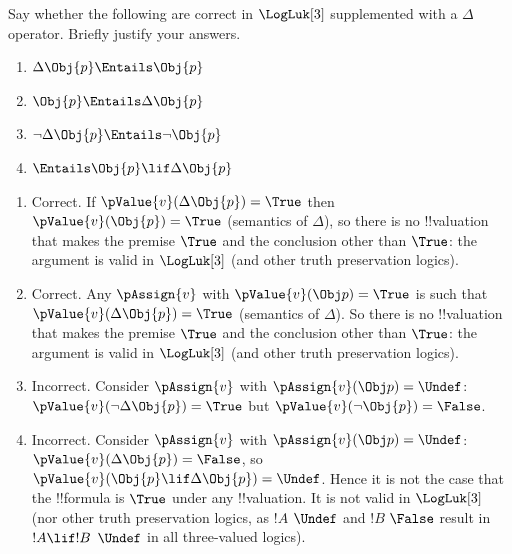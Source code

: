 \documentclass[../../../../include/open-logic-section]{subfiles}
\begin{document}
\begin{prob}[Validites]
Say whether the following are correct in $\LogLuk[3]$ supplemented with a $\Delta$ operator.
 Briefly justify your answers. 
\begin{enumerate}
	\item $\Delta \Obj{p} \Entails \Obj{p}$
	\item $\Obj{p} \Entails \Delta \Obj{p}$
	\item $\lnot \Delta \Obj{p} \Entails \lnot \Obj{p}$
	\item $\Entails \Obj{p}\lif \Delta \Obj{p}$
\end{enumerate}
\begin{ans}
\begin{enumerate}
	\item Correct. If $\pValue{v}(\Delta \Obj{p})=\True$ then  $\pValue{v}(\Obj{p})=\True$ (semantics of $\Delta$), so there is no !!{valuation} that makes the premise $\True$ and
	the conclusion other than $\True$: the argument is valid in $\LogLuk[3]$ (and other truth
	preservation logics).
	\item Correct. Any $\pAssign{v}$ with $\pValue{v}(\Obj p)=\True$ is such that 
	$\pValue{v}(\Delta \Obj{p})=\True$ (semantics of $\Delta$). So there is no !!{valuation} that makes the premise $\True$ and
	the conclusion other than $\True$: the argument is valid in $\LogLuk[3]$ (and other truth
	preservation logics).
	\item Incorrect. Consider $\pAssign{v}$ with $\pAssign{v}(\Obj p)=\Undef$: 
	$\pValue{v}(\lnot \Delta \Obj{p})=\True$ but $\pValue{v}(\lnot \Obj{p})=\False$.
	\item Incorrect. Consider $\pAssign{v}$ with $\pAssign{v}(\Obj p)=\Undef$:
	$\pValue{v}(\Delta \Obj{p})=\False$, so $\pValue{v}(\Obj{p}\lif \Delta \Obj{p})=\Undef$. Hence it is not the case that the !!{formula} is $\True$ under any !!{valuation}. It is not valid in $\LogLuk[3]$ (nor other truth
	preservation logics, as $!A$ $\Undef$ and $!B$ $\False$ result in $!A \lif !B$ $\Undef$ in 
	all three-valued logics).
\end{enumerate}
\end{ans}
\end{prob}
\end{document}
